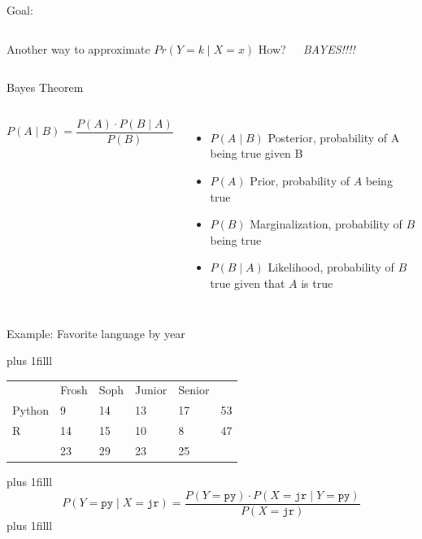 \documentclass[aspectratio=169,usenames,dvipsnames]{beamer}
\newcommand{\InstructorNotes}[1]{\textit{\color{orange}#1}}
\newcommand{\InstructorList}[1]{
\begin{itemize}
	\color{orange}
	#1
\end{itemize}
}
\newcommand{\bvfill}{\vskip0pt plus 1filll}
\begin{document}
\begin{frame}[c]{Goal:}

\begin{columns}
\centering
Another way to approximate $
Pr(Y = k \mid X = x)$
\centering
How?

\InstructorNotes{BAYES!!!!}
\end{columns}

\end{frame}
\begin{frame}[c]{Bayes Theorem}

\begin{columns}
\centering
\begin{equation*}
P(A\mid B)={\frac {P(A) \cdot P(B\mid A)}{P(B)}}
\end{equation*}
\centering
\InstructorList{
\item $P(A \mid B)$ Posterior, probability of A being true given B
\item $P(A)$ Prior, probability of $A$ being true
\item $P(B)$ Marginalization, probability of $B$ being true
\item $P(B \mid A)$ Likelihood, probability of $B$ true given that $A$ is true
}
\end{columns}

\end{frame}
\begin{frame}[c]{Example: Favorite language by year}

\bvfill

	\begin{table}[]
	\begin{tabular}{llllll}
	                            & Frosh                   & Soph                    & Junior                  & Senior                  &    \\ \cline{2-5}
	\multicolumn{1}{l|}{Python} & \multicolumn{1}{l|}{9}  & \multicolumn{1}{l|}{14} & \multicolumn{1}{l|}{13} & \multicolumn{1}{l|}{17} & 53 \\ \cline{2-5}
	\multicolumn{1}{l|}{R}      & \multicolumn{1}{l|}{14} & \multicolumn{1}{l|}{15} & \multicolumn{1}{l|}{10} & \multicolumn{1}{l|}{8}  & 47 \\ \cline{2-5}
	                            & 23                      & 29                      & 23                      & 25                      &
	\end{tabular}
	\end{table}
\bvfill
	\begin{equation*}
		P(Y = \texttt{py} \mid X = \texttt{jr})
		= \frac{P(Y = \texttt{py}) \cdot P(X = \texttt{jr} \mid Y = \texttt{py})}{P(X = \texttt{jr})}
	\end{equation*}
\bvfill

\end{frame}
\end{document}
